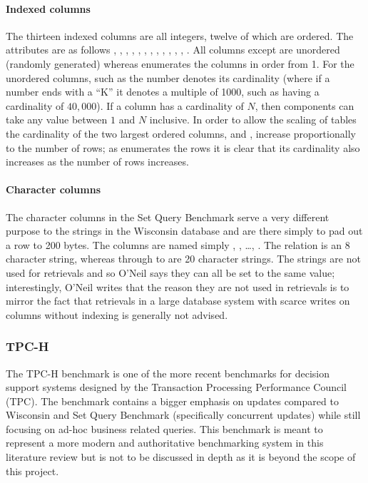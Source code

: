 \paragraph{Indexed columns} The thirteen indexed columns are all integers,
twelve of which are ordered. The attributes are as follows
, ,
, ,
, ,
, ,
, , ,
, . All columns except
 are unordered (randomly generated) whereas
 enumerates the columns in order from 1. For the
unordered columns, such as  the number denotes its
cardinality (where if a number ends with a ``K'' it denotes a multiple of 1000,
such as  having a cardinality of $40,000$). If a column
has a cardinality of $N$, then components can take any value between $1$ and
$N$ inclusive. In order to allow the scaling of tables the cardinality of the
two largest ordered columns,  and
, increase proportionally to the number of rows; as
 enumerates the rows it is clear that its
cardinality also increases as the number of rows increases.

\paragraph{Character columns} The character columns in the Set Query Benchmark
serve a very different purpose to the strings in the Wisconsin database and are
there simply to pad out a row to 200 bytes. The columns are named simply
, , \ldots, .
The relation
 is an 8 character string, whereas  through to
 are 20 character strings. The strings are not used for retrievals
and so O'Neil says they can all be set to the same value; interestingly, O'Neil
writes that the reason they are not used in retrievals is to mirror the fact
that
retrievals in a large database system with scarce writes on columns without
indexing is generally not advised.

\subsubsection{TPC-H}
The TPC-H benchmark is one of the more recent benchmarks for decision support
systems designed by the Transaction Processing Performance Council (TPC). The
benchmark contains a bigger emphasis on updates compared to Wisconsin and Set
Query Benchmark (specifically concurrent updates) while still focusing on
ad-hoc business related queries. This benchmark is meant to represent a more
modern and authoritative benchmarking system in this literature review but is
not to be discussed in depth as it is beyond the scope of this project.

